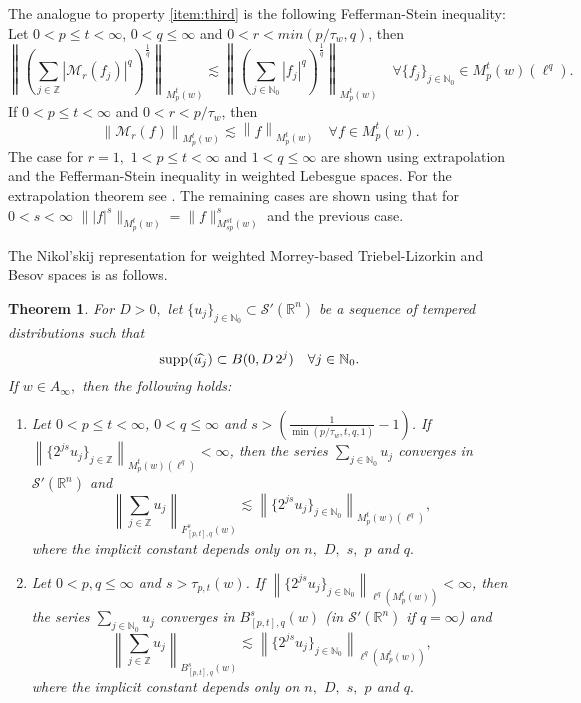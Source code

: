 \documentclass[10pt,a4paper]{article}
\newtheorem{theorem}{Theorem}[section]
\theoremstyle{remark}
\newcommand{\na}{\mathbb{N}}
\newcommand{\naz}{\mathbb{N}_0}
\newcommand{\ent}{\mathbb{Z}}
\newcommand{\rn}{{{\mathbb R}^n}}
\newcommand{\itlw}[4]{F_{#1,#3}^{#2}(#4)} %
\newcommand{\ibesw}[4]{B_{#1,#3}^{#2}(#4)} %
\newcommand{\mow}[3]{M_{#1}^{#2}(#3)}
\newcommand{\M}{\mathcal{M}} %
\newcommand{\abs}[1]{\left\vert #1 \right\vert}
\newcommand{\norm}[2]{\left\|#1\right\|_{#2}}
\newcommand{\supp}{{\rm{supp}}}
\newcommand{\A}{D}
\begin{document}
The analogue to property \ref{item:third} is the following Fefferman-Stein inequality:
Let $0<p\leq t<\infty$, $0<q\leq\infty$ and $0<r<min(p/\tau_w,q)$, then
\begin{equation}\label{eq:FTMorrey}
\norm{\left(\sum_{j\in\ent} \abs{\M_r(f_j)}^q\right)^{\frac{1}{q}}}{\mow{p}{t}{w}}\lesssim \norm{\left(\sum_{j\in\na_0} \abs{f_j}^q\right)^{\frac{1}{q}}}{\mow{p}{t}{w}}\quad \forall \{f_j\}_{j\in \na_0}\in \mow{p}{t}{w}(\ell^q).
\end{equation}
If $0<p\leq t <\infty$ and $0<r<p/\tau_w$, then 
\begin{equation*}
\norm{\M_r(f)}{\mow{p}{t}{w}}\lesssim \norm{f}{\mow{p}{t}{w}}\quad \forall f\in \mow{p}{t}{w}. 
\end{equation*}
The case for $r=1,$ $1<p\le t<\infty$ and $1<q\le \infty$ are shown using extrapolation and the Fefferman-Stein inequality in weighted Lebesgue spaces. For the extrapolation theorem see \cite[Theorem 5.3]{MR3538648}. The remaining cases are shown using that for $0<s<\infty$ $\| |f|^s \|_{\mow{p}{t}{w}} = \|f\|^s_{\mow{sp}{st}{w}}$ and the previous case.

The Nikol'skij representation for weighted Morrey-based Triebel-Lizorkin and Besov spaces is as follows.
\begin{theorem}\label{thm:Nikolskij:Morrey:weighted} For $\A> 0,$ let $\{u_j\}_{j \in \naz} \subset \mathcal{S}'(\rn)$ be a sequence of tempered distributions such that
\begin{equation*}
\supp(\widehat{u_j}) \subset B(0, \A\, 2^j ) \quad \forall j \in \naz.
\end{equation*}
If $w\in A_\infty,$ then the following holds:  
\begin{enumerate}
\item[(i)]\label{item:thh:Nikolskij:Morrey:TL} Let $0 < p \leq t < \infty$, $0 < q \leq \infty$ and $s > \left(\frac{1}{\min(p/\tau_w,t,q,1)} - 1 \right)$. If $\norm{\{2^{js} u_j\}_{j\in\ent}}{\mow{p}{t}{w}(\ell^{q})} < \infty$, then the series $\sum_{j \in \naz} u_j$ converges in $\mathcal{S}'(\rn)$ and 
\begin{equation*}
\norm{\sum_{j \in \ent} u_j}{\itlw{[p,t]}{s}{q}{w}} \lesssim  \norm{\{2^{js} u_j\}_{j\in\naz}}{\mow{p}{t}{w}(\ell^{q})},
\end{equation*}
where the implicit constant depends only on $n,$ $\A,$ $s,$ $p$ and  $q.$
\item[(ii)]\label{item:thh:Nikolskij:Morrey:B} Let $0 < p, q \leq \infty$ and $s > \tau_{p,t}(w)$. If $\norm{\{2^{js} u_j\}_{j\in\naz}}{\ell^{q}(\mow{p}{t}{w})} < \infty$, then the series $\sum_{j \in \naz} u_j$ converges in  $\ibesw{[p,t]}{s}{q}{w}$ (in $\mathcal{S}'(\rn)$ if $q=\infty$) and 
\begin{equation*}
\norm{\sum_{j \in \ent} u_j}{\ibesw{[p,t]}{s}{q}{w}} \lesssim  \norm{\{2^{js} u_j\}_{j\in\naz}}{\ell^{q}(\mow{p}{t}{w})},
\end{equation*}
where the implicit constant depends only on $n,$ $\A,$ $s,$ $p$ and $q.$
\end{enumerate}
\end{theorem}
\end{document}
